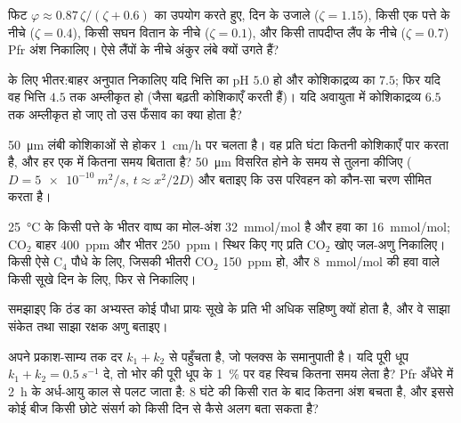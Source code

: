 \begin{exercise}[$\star\star$]\label{exo:b3:plant-molecular-physiology:5}
फिट $\varphi \approx 0.87\,\zeta/(\zeta + 0.6)$ का उपयोग करते हुए,
दिन के उजाले ($\zeta = 1.15$), किसी एक पत्ते के नीचे ($\zeta =
0.4$), किसी सघन वितान के नीचे ($\zeta = 0.1$), और किसी तापदीप्त लैंप
के नीचे ($\zeta = 0.7$) Pfr अंश निकालिए। ऐसे लैंपों के नीचे अंकुर लंबे
क्यों उगते हैं?
\end{exercise}

\begin{exercise}[$\star\star$]\label{exo:b3:plant-molecular-physiology:6}
 के लिए भीतर:बाहर अनुपात निकालिए यदि भित्ति का pH $5.0$ हो और
कोशिकाद्रव्य का $7.5$; फिर यदि वह भित्ति $4.5$ तक अम्लीकृत हो (जैसा
बढ़ती कोशिकाएँ करती हैं)। यदि अवायुता में कोशिकाद्रव्य $6.5$ तक
अम्लीकृत हो जाए तो उस फँसाव का क्या होता है?
\end{exercise}

\begin{exercise}[$\star\star$]\label{exo:b3:plant-molecular-physiology:7}
 \qty{50}{\micro m} लंबी कोशिकाओं से होकर \qty{1}{cm/h} पर चलता
है। वह प्रति घंटा कितनी कोशिकाएँ पार करता है, और हर एक में कितना समय
बिताता है? \qty{50}{\micro m} विसरित होने के समय से तुलना कीजिए ($D =
\qty{5e-10}{m^2/s}$, $t \approx x^{2}/2D$) और बताइए कि उस परिवहन को
कौन-सा चरण सीमित करता है।
\end{exercise}

\begin{exercise}[$\star\star$]\label{exo:b3:plant-molecular-physiology:8}
\qty{25}{\celsius} के किसी पत्ते के भीतर वाष्प का मोल-अंश
\qty{32}{mmol/mol} है और हवा का \qty{16}{mmol/mol}; CO$_{2}$ बाहर
\qty{400}{ppm} और भीतर \qty{250}{ppm}। स्थिर किए गए प्रति CO$_{2}$ खोए
जल-अणु निकालिए। किसी ऐसे C$_{4}$ पौधे के लिए, जिसकी भीतरी CO$_{2}$
\qty{150}{ppm} हो, और \qty{8}{mmol/mol} की हवा वाले किसी सूखे दिन के
लिए, फिर से निकालिए।
\end{exercise}

\begin{exercise}[$\star\star$]\label{exo:b3:plant-molecular-physiology:9}
समझाइए कि ठंड का अभ्यस्त कोई पौधा प्रायः सूखे के प्रति भी अधिक सहिष्णु
क्यों होता है, और वे साझा संकेत तथा साझा रक्षक अणु बताइए।
\end{exercise}

\begin{exercise}[$\star\star\star$]\label{exo:b3:plant-molecular-physiology:10}
 अपने प्रकाश-साम्य तक दर $k_{1} + k_{2}$ से पहुँचता है, जो
फ्लक्स के समानुपाती है। यदि पूरी धूप $k_{1} + k_{2} =
\qty{0.5}{s^{-1}}$ दे, तो भोर की पूरी धूप के \qty{1}{\%} पर वह स्विच
कितना समय लेता है? Pfr अँधेरे में \qty{2}{h} के अर्ध-आयु काल से पलट
जाता है: 8 घंटे की किसी रात के बाद कितना अंश बचता है, और इससे कोई बीज
किसी छोटे संसर्ग को किसी दिन से कैसे अलग बता सकता है?
\end{exercise}

